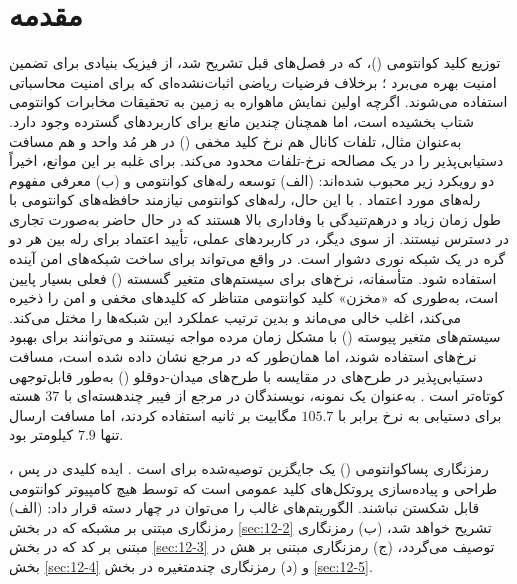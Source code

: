 \section{مقدمه}
\label{sec:12-1}
توزیع کلید کوانتومی ()، که در فصل‌های قبل تشریح شد، از فیزیک بنیادی برای تضمین امنیت بهره می‌برد \cite{12-1, 12-2, 12-3, 12-4, 12-5, 12-6}؛ برخلاف فرضیات ریاضی اثبات‌نشده‌ای که برای امنیت محاسباتی استفاده می‌شوند. اگرچه اولین نمایش  ماهواره به زمین \cite{12-5} به تحقیقات مخابرات کوانتومی شتاب بخشیده است، اما همچنان چندین مانع برای کاربردهای گسترده وجود دارد. به‌عنوان مثال، تلفات کانال هم نرخ کلید مخفی () در هر مُد واحد و هم مسافت دستیابی‌پذیر را در یک مصالحه نرخ-تلفات محدود می‌کند. برای غلبه بر این موانع، اخیراً دو رویکرد زیر محبوب شده‌اند: (الف) توسعه رله‌های کوانتومی \cite{12-7} و (ب) معرفی مفهوم رله‌های مورد اعتماد \cite{12-8}. با این حال، رله‌های کوانتومی نیازمند حافظه‌های کوانتومی با طول زمان زیاد و درهم‌تنیدگی با وفاداری بالا هستند که در حال حاضر به‌صورت تجاری در دسترس نیستند. از سوی دیگر، در کاربردهای عملی، تأیید اعتماد برای رله بین هر دو گره در یک شبکه نوری دشوار است.  در واقع می‌تواند برای ساخت شبکه‌های امن آینده استفاده شود. متأسفانه، نرخ‌های  برای سیستم‌های  متغیر گسسته () فعلی بسیار پایین است، به‌طوری که «مخزن» کلید کوانتومی متناظر که کلیدهای مخفی و امن را ذخیره می‌کند، اغلب خالی می‌ماند و بدین ترتیب عملکرد این شبکه‌ها را مختل می‌کند. سیستم‌های  متغیر پیوسته () با مشکل زمان مرده مواجه نیستند و می‌توانند برای بهبود نرخ‌های  استفاده شوند، اما همان‌طور که در مرجع \cite{12-6} نشان داده شده است، مسافت دستیابی‌پذیر در طرح‌های  در مقایسه با طرح‌های  میدان-دوقلو () به‌طور قابل‌توجهی کوتاه‌تر است \cite{12-9, 12-10, 12-11}. به‌عنوان یک نمونه، نویسندگان در مرجع \cite{12-12} از فیبر چند‌هسته‌ای با $37$ هسته برای دستیابی به نرخ  برابر با $105.7$ مگابیت بر ثانیه استفاده کردند، اما مسافت ارسال تنها $7.9$ کیلومتر بود.







رمزنگاری پسا‌کوانتومی () یک جایگزین توصیه‌شده برای  است \cite{12-13, 12-14, 12-15, 12-16, 12-17, 12-18, 12-19}. ایده کلیدی در پس ، طراحی و پیاده‌سازی پروتکل‌های کلید عمومی است که توسط هیچ کامپیوتر کوانتومی قابل شکستن نباشند. الگوریتم‌های غالب  را می‌توان در چهار دسته قرار داد: (الف) رمزنگاری مبتنی بر مشبکه که در بخش \ref{sec:12-2} تشریح خواهد شد، (ب) رمزنگاری مبتنی بر کد که در بخش \ref{sec:12-3} توصیف می‌گردد، (ج) رمزنگاری مبتنی بر هش در بخش \ref{sec:12-4} و (د) رمزنگاری چندمتغیره در بخش \ref{sec:12-5}.

